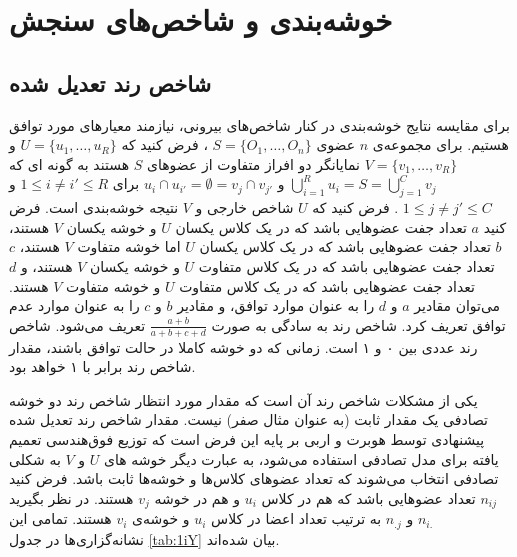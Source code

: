 \section{
خوشه‌بندی و شاخص‌های سنجش
‌}
\subsection{
شاخص رند تعدیل شده
\label{sec:ARI}
}

برای مقایسه نتایج خوشه‌بندی در کنار شاخص‌های بیرونی، نیازمند معیارهای مورد توافق هستیم.
برای مجموعه‌ی 
$n$
 عضوی 
$S = \{O_1, \ldots, O_n\}$
، فرض کنید که
$U = \{u_1, \ldots, u_R\}$
 و
$V = \{v_1, \ldots, v_R\}$
 نمایانگر دو افراز متفاوت از عضوهای $S$  هستند ‌به گونه ای که 
$\bigcup_{i=1}^R u_i = S = \bigcup_{j=1}^C v_j$
 و 
$u_i \cap u_{i'} = \emptyset = v_j \cap v_{j'}$
برای 
$1 \leq i \neq i' \leq R$
و 
$1 \leq j \neq j' \leq C$
. فرض کنید که $U$ شاخص خارجی و $V$ نتیجه خوشه‌بندی است. فرض کنید $a$ تعداد جفت عضوهایی باشد که در یک کلاس یکسان $U$ و خوشه یکسان $V$ هستند، $b$ تعداد جفت عضوهایی باشد که در یک کلاس یکسان $U$ اما خوشه متفاوت $V$ هستند، $c$ تعداد جفت عضوهایی باشد که در یک کلاس متفاوت $U$ و خوشه یکسان $V$ هستند، و $d$ تعداد جفت عضوهایی باشد که در یک کلاس متفاوت $U$ و خوشه متفاوت $V$ هستند. می‌توان مقادیر $a$ و $d$ را به عنوان موارد توافق، و مقادیر $b$ و $c$ را به عنوان موارد عدم توافق تعریف کرد. شاخص رند%
\cite{rand1971objective}
به سادگی به صورت 
$\frac{a+b}{a+b+c+d}$
 تعریف می‌شود. شاخص رند عددی بین ۰ و ۱ است. زمانی که دو خوشه کاملا در حالت توافق باشند، مقدار شاخص رند برابر با ۱ خواهد بود.

یکی از مشکلات شاخص رند آن است که مقدار مورد انتظار شاخص رند دو خوشه تصادفی یک مقدار ثابت (به عنوان مثال صفر) نیست. مقدار شاخص رند تعدیل شده%
 پیشنهادی توسط هوبرت و اربی%
\cite{hubert1985comparing}
 بر پایه این فرض است که توزیع فوق‌هندسی%
 تعمیم یافته برای مدل تصادفی استفاده می‌شود، به عبارت دیگر خوشه های $U$ و $V$ به شکلی تصادفی انتخاب می‌شوند که تعداد عضوهای کلاس‌ها و خوشه‌ها ثابت باشد. فرض کنید 
$n_{ij}$
 تعداد عضوهایی باشد که هم در کلاس 
$u_i$
 و هم در خوشه 
$v_j$
 هستند. در نظر بگیرید 
$n_{i.}$
 و 
$n_{.j}$ 
به ترتیب تعداد اعضا در کلاس
$u_i$
و خوشه‌ی
$v_i$
هستند. تمامی این نشانه‌گزاری‌ها در جدول
\autoref{tab:1iY}
بیان شده‌اند.

